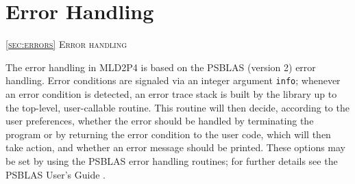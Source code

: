 \section{Error Handling\label{sec:errors}}
         {\textsc{\ref{sec:errors} Error handling}}

The error handling in MLD2P4 is based on the PSBLAS (version 2) error
handling. Error conditions are signaled via an integer argument
\verb|info|; whenever an error condition is detected, an error trace
stack is built by the library up to the top-level, user-callable
routine. This routine will then decide, according to the user
preferences, whether the error should be handled by terminating the
program or by returning the error condition to the user code, which
will then take action, and whether
an error message should be printed. These options may be set by using
the PSBLAS error handling routines; for further details see the PSBLAS
User's Guide \cite{PSBLASGUIDE}. 

